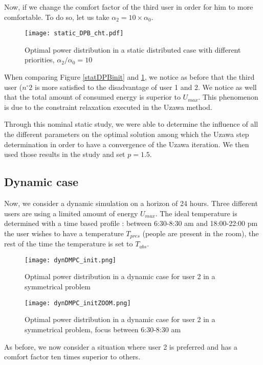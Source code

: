 \documentclass[conference, peerreview]{IEEEtran}
\edef\hc{\string:}
\begin{document}
Now, if we change the comfort factor of the third user in order for him to more comfortable. To do so, let us take $\alpha_2 = 10 \times \alpha_0 $.

\begin{figure}[H]
\centering
\texttt{[image: static\_DPB\_cht.pdf]}
\caption{Optimal power distribution in a static distributed case with different priorities, $\alpha_2 / \alpha_0 = 10$}
\label{statDPBcom}
\end{figure}
 
 When comparing Figure \ref{statDPBinit} and \ref{statDPBcom}, we notice as before that the third user ($n^{\circ}2$ is more satisfied to the disadvantage of user 1 and 2. We notice as well that the total amount of consumed energy is superior to $U_{max}$. This phenomenon is due to the constraint relaxation executed in the Uzawa method.
 
 Through this nominal static study, we were able to determine the influence of all the different parameters on the optimal solution among which the Uzawa step determination  in order to have a convergence of the Uzawa iteration.  We then used those results in the study and set $p = 1.5$.
 
 \subsection{Dynamic case}
 Now, we consider a dynamic simulation on a horizon of 24 hours. Three different users are using a limited amount of energy $U_{max}$. The ideal temperature is determined with a time based profile : between 6\hc 30-8\hc 30 am and 18\hc 00-22\hc 00 pm the user wishes to have a temperature $T_{pres}$ (people are present in the room), the rest of the time the temperature is set to $T_{abs}$. 
 
\begin{figure}[H]
\centering
\texttt{[image: dynDMPC\_init.png]}
\caption{Optimal power distribution in a dynamic case for user 2 in a symmetrical problem}
\label{dynDPBinit}
\end{figure}
\begin{figure}[H]
\centering
\texttt{[image: dynDMPC\_initZOOM.png]}
\caption{Optimal power distribution in a dynamic case for user 2 in a symmetrical problem, focus between 6\hc 30-8\hc 30 am}
\label{dynDPBinit}
\end{figure}

As before, we now consider a situation where user 2 is preferred and has a comfort factor ten times superior to others. 
 
\end{document}
